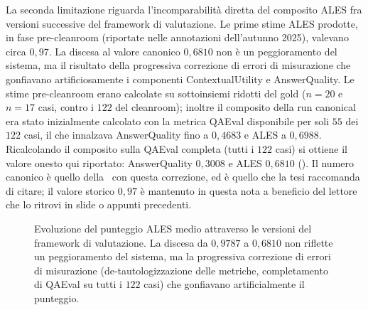 La seconda limitazione riguarda l'incomparabilità diretta del composito ALES fra versioni successive del framework di valutazione. Le prime stime ALES prodotte, in fase pre-cleanroom (riportate nelle annotazioni dell'autunno 2025), valevano circa $0{,}97$. La discesa al valore canonico $0{,}6810$ non è un peggioramento del sistema, ma il risultato della progressiva correzione di errori di misurazione che gonfiavano artificiosamente i componenti ContextualUtility e AnswerQuality. Le stime pre-cleanroom erano calcolate su sottoinsiemi ridotti del gold ($n=20$ e $n=17$ casi, contro i $122$ del cleanroom); inoltre il composito della run canonical era stato inizialmente calcolato con la metrica QAEval disponibile per soli $55$ dei $122$ casi, il che innalzava AnswerQuality fino a $0{,}4683$ e ALES a $0{,}6988$. Ricalcolando il composito sulla QAEval completa (tutti i $122$ casi) si ottiene il valore onesto qui riportato: AnswerQuality $0{,}3008$ e ALES $0{,}6810$ (). Il numero canonico è quello della \cleanroomrun\ con questa correzione, ed è quello che la tesi raccomanda di citare; il valore storico $0{,}97$ è mantenuto in questa nota a beneficio del lettore che lo ritrovi in slide o appunti precedenti.

\begin{figure}[t]
  \centering
  \caption{Evoluzione del punteggio ALES medio attraverso le versioni del framework di valutazione. La discesa da $0{,}9787$ a $0{,}6810$ non riflette un peggioramento del sistema, ma la progressiva correzione di errori di misurazione (de-tautologizzazione delle metriche, completamento di QAEval su tutti i $122$ casi) che gonfiavano artificialmente il punteggio.}
  \label{fig:ales-evol}
\end{figure}

